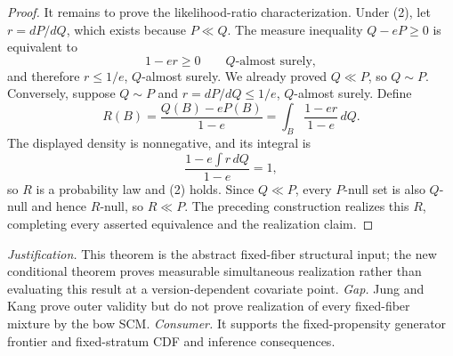 \documentclass{article}
\begin{document}
\begin{proof}
It remains to prove the likelihood-ratio characterization.  Under (2), let \(r=dP/dQ\), which exists because \(P\ll Q\).  The measure inequality \(Q-eP\ge0\) is equivalent to
\[
 1-er\ge0\qquad Q\text{-almost surely},
\]
and therefore \(r\le1/e\), \(Q\)-almost surely.  We already proved \(Q\ll P\), so \(Q\sim P\).  Conversely, suppose \(Q\sim P\) and \(r=dP/dQ\le1/e\), \(Q\)-almost surely.  Define
\[
 R(B)=\frac{Q(B)-eP(B)}{1-e}
     =\int_B\frac{1-er}{1-e}\,dQ.
\]
The displayed density is nonnegative, and its integral is
\[
 \frac{1-e\int r\,dQ}{1-e}=1,
\]
so \(R\) is a probability law and (2) holds.  Since \(Q\ll P\), every \(P\)-null set is also \(Q\)-null and hence \(R\)-null, so \(R\ll P\).  The preceding construction realizes this \(R\), completing every asserted equivalence and the realization claim.
\end{proof}
\par\smallskip\noindent \textit{Justification.} This theorem is the abstract fixed-fiber structural input; the new conditional theorem proves measurable simultaneous realization rather than evaluating this result at a version-dependent covariate point. \textit{Gap.} Jung and Kang prove outer validity but do not prove realization of every fixed-fiber mixture by the bow SCM. \textit{Consumer.} It supports the fixed-propensity generator frontier and fixed-stratum CDF and inference consequences.
\end{document}
